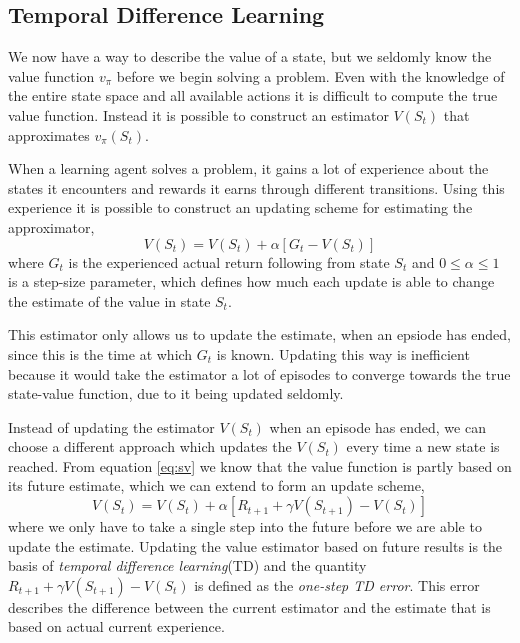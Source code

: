 \documentclass[11pt]{article}
\begin{document}
\maketitle

\subsection{Temporal Difference Learning}\label{sec:td}

We now have a way to describe the value of a state, but we seldomly know the
value function $v_\pi$ before we begin solving a problem.
Even with the knowledge of the entire state space and all available actions
it is difficult to compute the true value function.
Instead it is possible to construct an estimator $V(S_t)$ that
approximates $v_\pi(S_t)$.

When a learning agent solves a problem, it gains a lot of experience
about the states it encounters and rewards it earns through different transitions.
Using this experience it is possible to construct an updating scheme
for estimating the approximator,
\begin{equation}
    V(S_t) = V(S_t) + \alpha [G_t - V(S_t)]
\end{equation}
where $G_t$ is the experienced actual return following from state
$S_t$ and $0 \leq \alpha \leq 1$ is a step-size parameter, 
which defines how much each update is able to change the estimate
of the value in state $S_t$.

This estimator only allows us to update the estimate, when an epsiode
has ended, since this is the time at which $G_t$ is known.
Updating this way is inefficient because it would take the estimator
a lot of episodes to converge towards the true state-value function,
due to it being updated seldomly. 

Instead of updating the estimator $V(S_t)$ when an episode has
ended, we can choose a different approach which updates the $V(S_t)$
every time a new state is reached.
From equation \ref{eq:sv} we know that the value function is partly based on its future
estimate, which we can extend to form an update scheme,
\begin{equation}
    V(S_t) = V(S_t) + \alpha  [R_{t+1} + \gamma  V(S_{t+1}) - V(S_t)]
\end{equation}
where we only have to take a single step into the future before we are
able to update the estimate.
Updating the value estimator based on future results is the basis
of \textit{temporal difference learning}(TD) and the quantity $R_{t+1} + \gamma  V(S_{t+1}) - V(S_t)$
is defined as the \textit{one-step TD error}.
This error describes the difference between the current estimator
and the estimate that is based on actual current experience.
\end{document}
